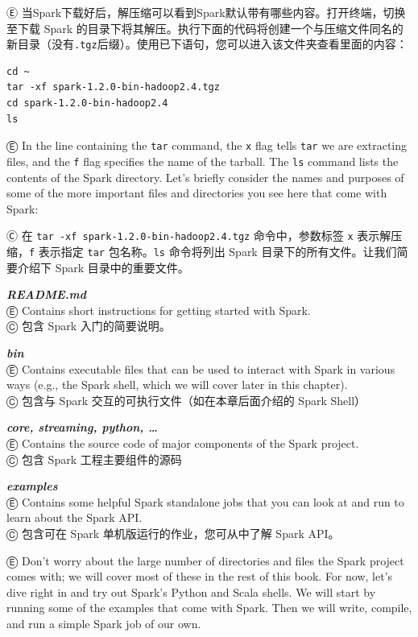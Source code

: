 Ⓔ 当Spark下载好后，解压缩可以看到Spark默认带有哪些内容。打开终端，切换至下载 Spark 的目录下将其解压。执行下面的代码将创建一个与压缩文件同名的新目录（没有\lstinline{.tgz}后缀）。使用已下语句，您可以进入该文件夹查看里面的内容：

\begin{lstlisting}
cd ~
tar -xf spark-1.2.0-bin-hadoop2.4.tgz
cd spark-1.2.0-bin-hadoop2.4
ls
\end{lstlisting}

Ⓔ \textcolor{etc}{In the line containing the \lstinline{tar} command, the \lstinline{x} flag tells \lstinline{tar} we are extracting files, and the \lstinline{f} flag specifies the name of the tarball. The \lstinline{ls} command lists the contents of the Spark directory. Let's briefly consider the names and
purposes of some of the more important files and directories you see here that come with Spark:}

Ⓒ 在 \lstinline{tar -xf spark-1.2.0-bin-hadoop2.4.tgz} 命令中，参数标签 \lstinline{x} 表示解压缩，\lstinline{f} 表示指定 \lstinline{tar} 包名称。\lstinline{ls} 命令将列出 Spark 目录下的所有文件。让我们简要介绍下 Spark 目录中的重要文件。

\textbf{\emph{README.md}}\\
Ⓔ Contains short instructions for getting started with Spark.\\
Ⓒ 包含 Spark 入门的简要说明。

\textbf{\emph{bin}}\\
Ⓔ Contains executable files that can be used to interact with Spark in
various ways (e.g., the Spark shell, which we will cover later in this
chapter).\\
Ⓒ 包含与 Spark 交互的可执行文件（如在本章后面介绍的 Spark
Shell）

\textbf{\emph{core, streaming, python, \ldots{}}}\\
Ⓔ Contains the source code of major components of the Spark project.\\
Ⓒ 包含 Spark 工程主要组件的源码

\textbf{\emph{examples}}\\
Ⓔ Contains some helpful Spark standalone jobs that you can look at and run to learn about the Spark API.\\
Ⓒ 包含可在 Spark 单机版运行的作业，您可从中了解 Spark API。

Ⓔ \textcolor{etc}{Don't worry about the large number of directories and files the Spark project comes with; we will cover most of these in the rest of this book. For now, let's dive right in and try out Spark's Python and Scala shells. We will start by running some of the examples that come with Spark. Then we will write, compile, and run a simple Spark job of our own.}

